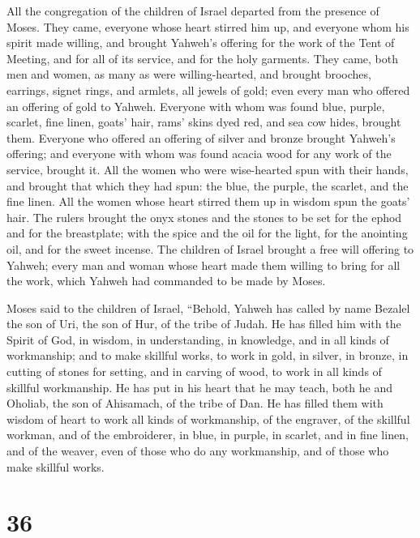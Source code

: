  All the congregation of the children of Israel departed
from the presence of Moses.  They came, everyone whose
heart stirred him up, and everyone whom his spirit made willing, and
brought Yahweh's offering for the work of the Tent of Meeting, and for
all of its service, and for the holy garments.  They
came, both men and women, as many as were willing-hearted, and brought
brooches, earrings, signet rings, and armlets, all jewels of gold; even
every man who offered an offering of gold to Yahweh. 
Everyone with whom was found blue, purple, scarlet, fine linen, goats'
hair, rams' skins dyed red, and sea cow hides, brought them.
 Everyone who offered an offering of silver and bronze
brought Yahweh's offering; and everyone with whom was found acacia wood
for any work of the service, brought it.  All the women
who were wise-hearted spun with their hands, and brought that which they
had spun: the blue, the purple, the scarlet, and the fine linen.
 All the women whose heart stirred them up in wisdom spun
the goats' hair.  The rulers brought the onyx stones and
the stones to be set for the ephod and for the breastplate;
 with the spice and the oil for the light, for the
anointing oil, and for the sweet incense.  The children
of Israel brought a free will offering to Yahweh; every man and woman
whose heart made them willing to bring for all the work, which Yahweh
had commanded to be made by Moses.

 Moses said to the children of Israel, ``Behold, Yahweh
has called by name Bezalel the son of Uri, the son of Hur, of the tribe
of Judah.  He has filled him with the Spirit of God, in
wisdom, in understanding, in knowledge, and in all kinds of workmanship;
 and to make skillful works, to work in gold, in silver,
in bronze,  in cutting of stones for setting, and in
carving of wood, to work in all kinds of skillful workmanship.
 He has put in his heart that he may teach, both he and
Oholiab, the son of Ahisamach, of the tribe of Dan.  He
has filled them with wisdom of heart to work all kinds of workmanship,
of the engraver, of the skillful workman, and of the embroiderer, in
blue, in purple, in scarlet, and in fine linen, and of the weaver, even
of those who do any workmanship, and of those who make skillful works.

\hypertarget{section-35}{%
\section{36}\label{section-35}}

